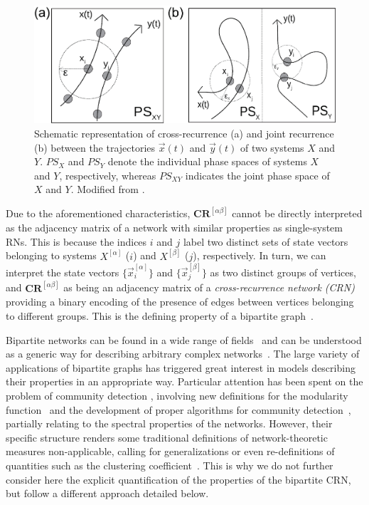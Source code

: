 \begin{figure}
	\centering
	\includegraphics[width=0.8\columnwidth]{Chapter03_RecurrenceNt/crossrec01.eps}
	\caption{Schematic representation of cross-recurrence (a) and joint recurrence (b) between the trajectories $\vec{x}(t)$ and $\vec{y}(t)$ of two systems $X$ and $Y$. $PS_X$ and $PS_Y$ denote the individual phase spaces of systems $X$ and $Y$, respectively, whereas $PS_{XY}$ indicates the joint phase space of $X$ and $Y$. Modified from \cite{Feldhoff2011}. }
\label{fig:sketch_cr_jr}
\end{figure}

		Due to the aforementioned characteristics, $\mathbf{CR}^{[\alpha\beta]}$ cannot be directly interpreted as the adjacency matrix of a network with similar properties as single-system RNs. This is because the indices $i$ and $j$ label two distinct sets of state vectors belonging to systems $X^{[\alpha]}$ ($i$) and $X^{[\beta]}$ ($j$), respectively. In turn, we can interpret the state vectors $\{\vec{x}^{[\alpha]}_i\}$ and $\{\vec{x}^{[\beta]}_j\}$ as two distinct groups of vertices, and $\mathbf{CR}^{[\alpha\beta]}$ as being an adjacency matrix of a \emph{cross-recurrence network (CRN)} providing a binary encoding of the presence of edges between vertices belonging to different groups. This is the defining property of a bipartite graph~\cite{Newman2003}.

		Bipartite networks can be found in a wide range of fields~\cite{Guimera2007,Kitsak2011} and can be understood as a generic way for describing arbitrary complex networks~\cite{Guillaume2004,Guillaume2006}. The large variety of applications of bipartite graphs has triggered great interest in models describing their properties in an appropriate way. Particular attention has been spent on the problem of community detection \cite{Fortunato2010}, involving new definitions for the modularity function~\cite{Barber2007,Guimera2007,Murata2009,Suzuki2009} and the development of proper algorithms for community detection~\cite{Barber2007,Du2008,Lehmann2008,Sawardecker2009}, partially relating to the spectral properties of the networks. However, their specific structure renders some traditional definitions of network-theoretic measures non-applicable, calling for generalizations or even re-definitions of quantities such as the clustering coefficient~\cite{Lind2005,Zhang2008PhysA}. This is why we do not further consider here the explicit quantification of the properties of the bipartite CRN, but follow a different approach detailed below.

